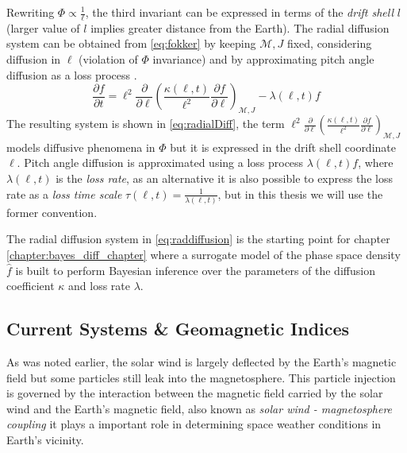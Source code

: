 Rewriting $\Phi \propto \frac{1}{\ell}$, the third invariant can be expressed in terms of the 
\emph{drift shell} $l$ (larger value of $l$ implies greater distance from the Earth). The radial diffusion system 
can be obtained from \cref{eq:fokker} by keeping $\mathcal{M}, J$ fixed, considering diffusion in $\ell$ 
(violation of $\Phi$ invariance) and by approximating pitch angle diffusion as a loss process 
\citep{roederer2012dynamics,Walt1970}.  
%
\begin{equation}\label{eq:radialDiff}
    \frac{\partial{f}}{\partial{t}} = \ell^2 \frac{\partial}{\partial{\ell}} \left( \frac{\kappa(\ell,
        t)}{\ell^{2}} \frac{\partial{f}}{\partial{\ell}}
    \right)_{\mathcal{M}, J} - \lambda(\ell,t) f
\end{equation}
%
The resulting system is shown in \cref{eq:radialDiff}, the term 
$\ell^2 \frac{\partial}{\partial{\ell}} \left( \frac{\kappa(\ell,t)}{\ell^{2}} \frac{\partial{f}}{\partial{\ell}}
\right)_{\mathcal{M}, J}$ models diffusive phenomena in $\Phi$ but it is expressed in the drift shell coordinate $\ell$. 
Pitch angle diffusion is approximated using a loss process $\lambda(\ell,t) f$, where $\lambda(\ell,t)$ is the 
\emph{loss rate}, as an alternative it is also possible to express the loss rate as a \emph{loss time scale} 
$\tau(\ell,t) = \frac{1}{\lambda(\ell,t)}$, but in this thesis we will use the former convention.

The radial diffusion system in \cref{eq:raddiffusion} is the starting point for chapter 
\ref{chapter:bayes_diff_chapter} where a surrogate model of the phase space density $\hat{f}$ is built to 
perform Bayesian inference over the parameters of the diffusion coefficient $\kappa$ and loss rate 
$\lambda$.

\subsection{Current Systems \& Geomagnetic Indices}\label{sec:geoindex}

As was noted earlier, the solar wind is largely deflected by the Earth's magnetic field but some particles still 
leak into the magnetosphere. This particle injection is governed by the interaction between the magnetic field carried 
by the solar wind and the Earth's magnetic field, also known as \emph{solar wind - magnetosphere coupling} it 
plays a important role in determining space weather conditions in Earth's vicinity. 

